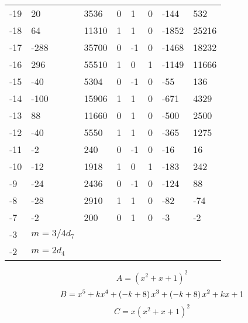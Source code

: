 \documentclass{amsart}
\begin{document}
\begin{longtable}{|l|l|l|lllll|}
-19&20&3536&0&1&0&-144&532\\
-18&64&11310&1&1&0&-1852&25216\\
-17&-288&35700&0&-1&0&-1468&18232\\
-16&296&55510&1&0&1&-1149&11666\\
-15&-40&5304&0&-1&0&-55&136\\
-14&-100&15906&1&1&0&-671&4329\\
-13&88&11660&0&1&0&-500&2500\\
-12&-40&5550&1&1&0&-365&1275\\
-11&-2&240&0&-1&0&-16&16\\
-10&-12&1918&1&0&1&-183&242\\
-9&-24&2436&0&-1&0&-124&88\\
-8&-28&2910&1&1&0&-82&-74\\
-7&-2&200&0&1&0&-3&-2\\
-3&$m=3/4d_{7}$&&\multicolumn{5}{c|}{}\\
-2&$m=2d_{4}$&&\multicolumn{5}{c|}{}\\
\hline
\end{longtable}
$$A=(x^2
 + x
 + 1)^{2}$$
$$B=x^5
 + k\*x^4
 + \left(-k
 + 8\right) \*x^3
 + \left(-k
 + 8\right) \*x^2
 + k\*x
 + 1$$
$$C=x(x^2
 + x
 + 1)^{2}$$
\end{document}
